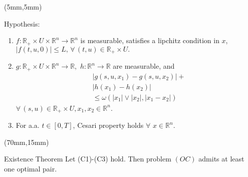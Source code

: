 \begin{frame}[plain]
	\begin{textblock*}{60mm}(5mm,5mm)
		\begin{graybox}{Hypothesis:}
			\begin{enumerate}[(\textbf{{C}}-1)]
				\item
					$
					f:\mathbb{R}_{+}\times U
					\times \mathbb{R}^n\rightarrow 
					\mathbb{R}^n
					$ is measurable, satisfies a lipchitz
					condition in $x$,
					$
					|f(t,u,0)|\leq L,\,
					\forall\,(t,u)\in
					\mathbb{R}_{+}\times U .
					$
				\item
					$
					g:\mathbb{R}_{+}\times U\times 
					\mathbb{R}^n\rightarrow \mathbb{R},
					$ 
					$
					h:\mathbb{R}^n\rightarrow \mathbb{R}
					$ are measurable, and
					\begin{align*}
					&|g(s,u,x_1)-g(s,u,x_2)|+\\
					&|h(x_1)-h(x_2)|\\
					&\leq \omega(|x_1|\vee |x_2|,|x_1-x_2|)
					\end{align*}
					$
					\forall\, (s,u)\in \mathbb{R}_{+}
					\times U,x_1,x_2\in \mathbb{R}^n
					$.
				\item
					For a.a. $t\in[0,T]$, Cesari property holds $\forall$ $x\in \mathbb{R}^n$.
			\end{enumerate}	
		\end{graybox}
	\end{textblock*}


	
	\begin{textblock*}{55mm}(70mm,15mm)
		\begin{graybox}{Existence Theorem}
			Let (C1)-(C3) hold. Then problem $(OC)$ admits at least one optimal pair.
		\end{graybox}
	\end{textblock*}
\end{frame}

